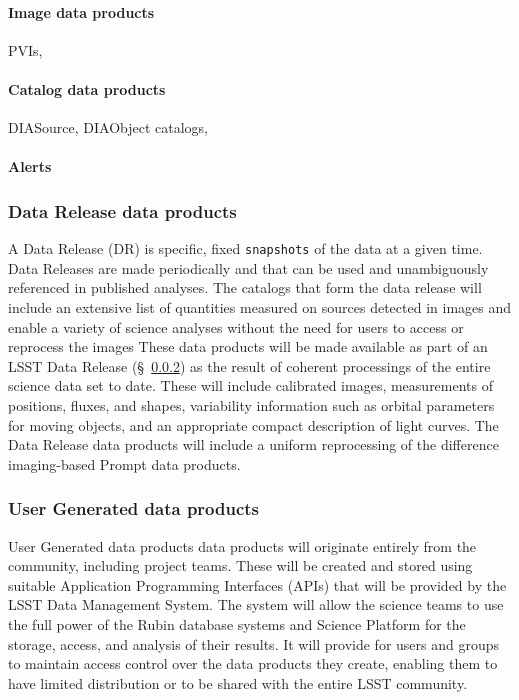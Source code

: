\paragraph {Image data products}  PVIs,   
\paragraph {Catalog data products}  DIASource, DIAObject catalogs, 
\paragraph {Alerts}  


\subsubsection{Data Release data products} \label{sec:dp-prompt}
A Data Release (DR) is specific, fixed {\tt snapshots} of the data at a given time. 
Data Releases are made periodically and that can be used and 
unambiguously referenced in published analyses. 
The catalogs that form the data release will include an extensive list of quantities measured on sources detected in images and 
enable a variety of science analyses without the need for users to access or reprocess the images
These data products will be made available as part of an LSST Data Release (\S~\ref{}) as the result of coherent
processings of the entire science data set to date. 
These will include calibrated images, measurements of positions, fluxes, and shapes,  variability information such as orbital
parameters for moving objects, and an appropriate compact description of light curves.
The Data Release data products will include a uniform reprocessing of the difference imaging-based Prompt data products.


\subsubsection{User Generated data products} 
User Generated data products data products will originate entirely from the community, including project teams. 
These will be created and stored using suitable Application Programming Interfaces (APIs) 
that will be provided by the LSST Data Management System. 
The system will allow the science teams to use the full power of the Rubin database systems and
Science Platform for the storage, access, and analysis of their results. 
It will provide for users and groups to maintain access control over the data products they create, 
enabling them to have limited distribution or to be shared with the entire LSST community. 

